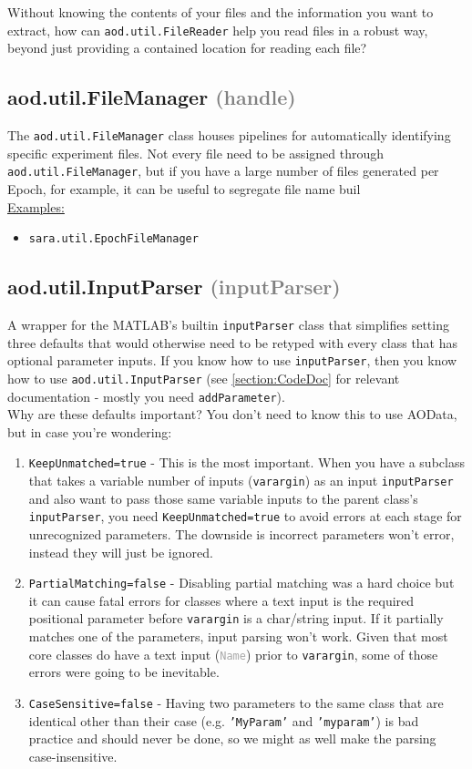 \documentclass[10pt]{exam}
\newcommand\myurl[1]{\textcolor{blue}{\underline{#1}}}
\newcommand\myparent[1]{\textcolor{gray}{(#1)}}
\newcommand\aodclass[1]{\textcolor{codeblue}{\texttt{#1}}}
\newcommand\matclass[1]{\textcolor{codeblue}{\texttt{#1}}}
\newcommand\aodprop[1]{\textcolor{darkgray}{\texttt{#1}}}
\newcommand\matfcn[1]{\textcolor{darkteal}{\texttt{#1}}}
\newcommand\docheader[1]{\vspace{0.6ex}\noindent\underline{#1}\vspace{0.15ex}}
\begin{document}
		Without knowing the contents of your files and the information you want to extract, how can \aodclass{aod.util.FileReader} help you read files in a robust way, beyond just providing a contained location for reading each file?  
	
	\subsection{aod.util.FileManager \myparent{handle}}
		\noindent The \aodclass{aod.util.FileManager} class houses pipelines for automatically identifying specific experiment files. Not every file need to be assigned through \aodclass{aod.util.FileManager}, but if you have a large number of files generated per Epoch, for example, it can be useful to segregate file name buil\\
		\docheader{Examples:}
		\begin{itemize}
			\item \aodclass{sara.util.EpochFileManager}
		\end{itemize}
	
	\subsection{aod.util.InputParser \myparent{inputParser}}
		\label{subsection:InputParserDoc}
		\noindent A wrapper for the MATLAB's builtin \matclass{inputParser} class that simplifies setting three defaults that would otherwise need to be retyped with every class that has optional parameter inputs. If you know how to use \matclass{inputParser}, then you know how to use \aodclass{aod.util.InputParser} (see \myurl{\ref{section:CodeDoc}} for relevant documentation - mostly you need \matfcn{addParameter}).\\
		Why are these defaults important? You don't need to know this to use AOData, but in case you're wondering:
		\begin{enumerate}
			\item \texttt{KeepUnmatched=true} - This is the most important. When you have a subclass that takes a variable number of inputs (\texttt{varargin}) as an input \matfcn{inputParser} and also want to pass those same variable inputs to the parent class's \matfcn{inputParser}, you need \texttt{KeepUnmatched=true} to avoid errors at each stage for unrecognized parameters. The downside is incorrect parameters won't error, instead they will just be ignored. 
			\item \texttt{PartialMatching=false} - Disabling partial matching was a hard choice but it can cause fatal errors for classes where a text input is the required positional parameter before \texttt{varargin} is a char/string input. If it partially matches one of the parameters, input parsing won't work. Given that most core classes do have a text input (\aodprop{Name}) prior to \texttt{varargin}, some of those errors were going to be inevitable.
			\item \texttt{CaseSensitive=false} - Having two parameters to the same class that are identical other than their case (e.g. \texttt{'MyParam'} and \texttt{'myparam'}) is bad practice and should never be done, so we might as well make the parsing case-insensitive.
		\end{enumerate}
\end{document}
